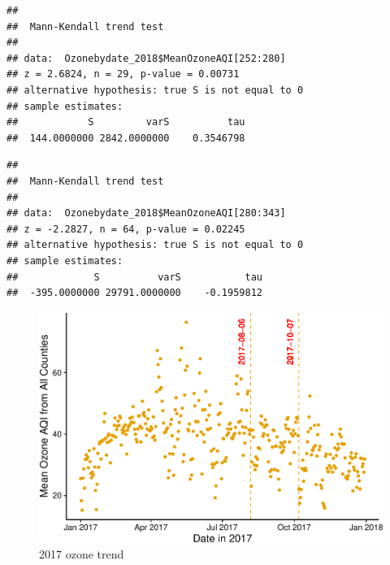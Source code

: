 \documentclass[12pt,]{article}
\newenvironment{Shaded}{\begin{snugshade}}{\end{snugshade}}
\newcommand{\KeywordTok}[1]{\textcolor[rgb]{0.13,0.29,0.53}{\textbf{#1}}}
\newcommand{\DecValTok}[1]{\textcolor[rgb]{0.00,0.00,0.81}{#1}}
\newcommand{\OperatorTok}[1]{\textcolor[rgb]{0.81,0.36,0.00}{\textbf{#1}}}
\newcommand{\NormalTok}[1]{#1}
\begin{document}
\begin{Shaded}
\end{Shaded}

\begin{verbatim}
## 
##  Mann-Kendall trend test
## 
## data:  Ozonebydate_2018$MeanOzoneAQI[252:280]
## z = 2.6824, n = 29, p-value = 0.00731
## alternative hypothesis: true S is not equal to 0
## sample estimates:
##            S         varS          tau 
##  144.0000000 2842.0000000    0.3546798
\end{verbatim}

\begin{Shaded}
\end{Shaded}

\begin{verbatim}
## 
##  Mann-Kendall trend test
## 
## data:  Ozonebydate_2018$MeanOzoneAQI[280:343]
## z = -2.2827, n = 64, p-value = 0.02245
## alternative hypothesis: true S is not equal to 0
## sample estimates:
##             S          varS           tau 
##  -395.0000000 29791.0000000    -0.1959812
\end{verbatim}

\pagebreak

\begin{figure}
\centering
\includegraphics{Xia_ENV_872_Project_files/figure-latex/Final visualization 2-1.pdf}
\caption{2017 ozone trend}
\end{figure}
\end{document}
